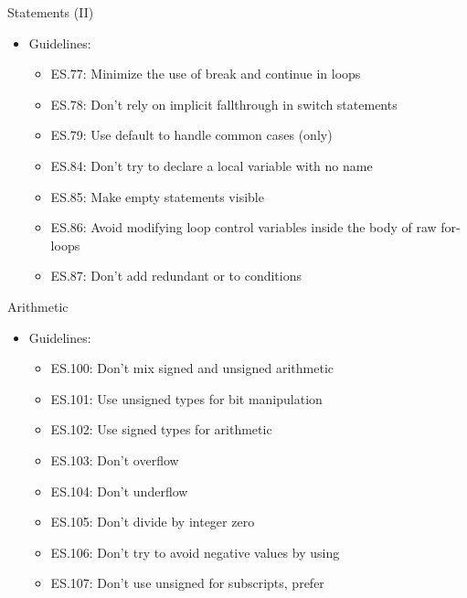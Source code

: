 \begin{frame}[t]{Statements (II)}
\begin{itemize}
  \item Guidelines:
    \begin{itemize}
      \item ES.77: Minimize the use of break and continue in loops
      \item ES.78: Don’t rely on implicit fallthrough in switch statements
      \item ES.79: Use default to handle common cases (only)
      \item ES.84: Don’t try to declare a local variable with no name
      \item ES.85: Make empty statements visible
      \item ES.86: Avoid modifying loop control variables inside the body of raw for-loops
      \item ES.87: Don’t add redundant \cppid{==} or \cppid{!=} to conditions
    \end{itemize}
\end{itemize}
\end{frame}

\begin{frame}[t]{Arithmetic}
\begin{itemize}
  \item Guidelines:
    \begin{itemize}
      \item ES.100: Don’t mix signed and unsigned arithmetic
      \item ES.101: Use unsigned types for bit manipulation
      \item ES.102: Use signed types for arithmetic
      \item ES.103: Don’t overflow
      \item ES.104: Don’t underflow
      \item ES.105: Don’t divide by integer zero
      \item ES.106: Don’t try to avoid negative values by using 
      \item ES.107: Don’t use unsigned for subscripts, prefer 
    \end{itemize}
\end{itemize}
\end{frame}
